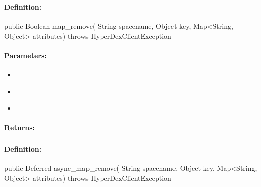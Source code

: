 \pagebreak
\subsubsection{}
\label{api:java:map_remove}


\paragraph{Definition:}
\begin{javacode}
public Boolean map_remove(
        String spacename,
        Object key,
        Map<String, Object> attributes) throws HyperDexClientException
\end{javacode}

\paragraph{Parameters:}
\begin{itemize}[noitemsep]
\item {}\\

\item {}\\

\item {}\\

\end{itemize}

\paragraph{Returns:}


\pagebreak
\subsubsection{}
\label{api:java:async_map_remove}


\paragraph{Definition:}
\begin{javacode}
public Deferred async_map_remove(
        String spacename,
        Object key,
        Map<String, Object> attributes) throws HyperDexClientException
\end{javacode}

